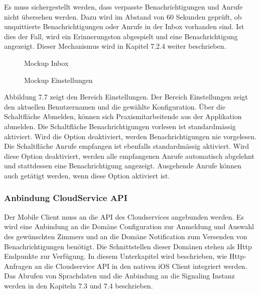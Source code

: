Es muss sichergestellt werden, dass verpasste Benachrichtigungen und Anrufe nicht übersehen werden.
Dazu wird im Abstand von 60 Sekunden geprüft, ob unquittierte Benachrichtigungen oder Anrufe in der Inbox vorhanden sind.
Ist dies der Fall, wird ein Erinnerungston abgespielt und eine Benachrichtigung angezeigt.
Dieser Mechanismus wird in Kapitel 7.2.4 weiter beschrieben.

\begin{figure}[h]
    \centering
    \begin{minipage}[b]{0.4\textwidth}
        \caption{Mockup Inbox}
    \end{minipage}
    \hfill
    \begin{minipage}[b]{0.4\textwidth}
        \caption{Mockup Einstellungen}
    \end{minipage}\label{fig:Mockups-Inbox-Settings}
\end{figure}

Abbildung 7.7 zeigt den Bereich Einstellungen.
Der Bereich Einstellungen zeigt den aktuellen Benutzernamen und die gewählte Konfiguration.
Über die Schaltfläche Abmelden, können sich Praxismitarbeitende aus der Applikation abmelden.
Die Schaltfläche Benachrichtigungen vorlesen ist standardmässig aktiviert.
Wird die Option deaktiviert, werden Benachrichtigungen nie vorgelesen.
Die Schaltfläche Anrufe empfangen ist ebenfalls standardmässig aktiviert.
Wird diese Option deaktiviert, werden alle empfangenen Anrufe automatisch abgelehnt und stattdessen eine Benachrichtigung angezeigt.
Ausgehende Anrufe können auch getätigt werden, wenn diese Option aktiviert ist.

\subsubsection{Anbindung CloudService API}

Der Mobile Client muss an die API des Cloudservices angebunden werden.
Es wird eine Anbindung an die Domäne Configuration zur Anmeldung und Auswahl des gewünschten Zimmers und an die Domäne Notification zum Versenden von Benachrichtigungen benötigt.
Die Schnittstellen dieser Domänen stehen als Http Endpunkte zur Verfügung.
In diesem Unterkapitel wird beschrieben, wie Http-Anfragen an die Cloudservice API in den nativen iOS Client integriert werden.
Das Abrufen von Sprachdaten und die Anbindung an die Signaling Instanz werden in den Kapiteln 7.3 und 7.4 beschrieben.

